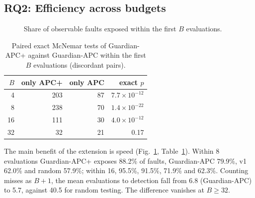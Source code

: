 \documentclass[conference]{IEEEtran}
\begin{document}
\subsection{RQ2: Efficiency across budgets}
\begin{figure}[t]
\centering
{}
\caption{Share of observable faults exposed within the first $B$ evaluations.}
\label{fig:curve}
\end{figure}

\begin{table}[t]
\centering
\caption{Paired exact McNemar tests of Guardian-APC+ against Guardian-APC within the first $B$ evaluations (discordant pairs).}
\label{tab:budget}
\begin{tabular}{rrrr}
\toprule
$B$ & only APC+ & only APC & exact $p$\\
\midrule
4 & 203 & 87 & $7.7\times10^{-12}$\\
8 & 238 & 70 & $1.4\times10^{-22}$\\
16 & 111 & 30 & $4.0\times10^{-12}$\\
32 & 32 & 21 & 0.17\\
\bottomrule
\end{tabular}
\end{table}

The main benefit of the extension is speed (Fig.~\ref{fig:curve}, Table~\ref{tab:budget}). Within 8 evaluations Guardian-APC+ exposes 88.2\% of faults, Guardian-APC 79.9\%, v1 62.0\% and random 57.9\%; within 16, 95.5\%, 91.5\%, 71.9\% and 62.3\%. Counting misses as $B{+}1$, the mean evaluations to detection fall from 6.8 (Guardian-APC) to 5.7, against 40.5 for random testing. The difference vanishes at $B\ge32$.
\end{document}
